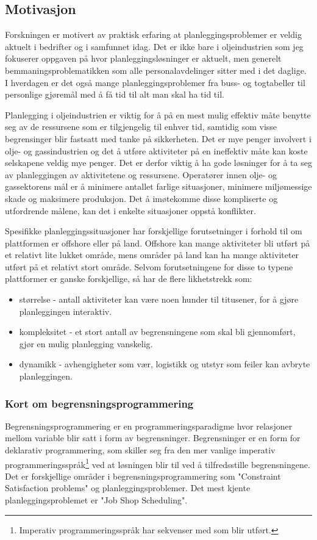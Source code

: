 \subsection{Motivasjon}
Forskningen er motivert av praktisk erfaring at planleggingsproblemer er veldig aktuelt i bedrifter og i samfunnet idag. Det er ikke bare i oljeindustrien som jeg fokuserer oppgaven på hvor planleggingsløsninger er aktuelt, men generelt bemmaningsproblematikken som alle personalavdelinger sitter med i det daglige. I hverdagen er det også mange planleggingsproblemer fra buss- og togtabeller til personlige gjøremål med å få tid til alt man skal ha tid til.

Planlegging i oljeindustrien er viktig for å på en mest mulig effektiv måte benytte seg av de ressursene som er tilgjengelig til enhver tid, samtidig som visse begrensinger blir fastsatt med tanke på sikkerheten. Det er mye penger involvert i olje- og gassindustrien og det å utføre aktiviteter på en ineffektiv måte kan koste selskapene veldig mye penger. Det er derfor viktig å ha gode løsninger for å ta seg av planleggingen av aktivitetene og ressursene. Operatører innen olje- og gassektorens mål er å minimere antallet farlige situasjoner, minimere miljømessige skade og maksimere produksjon. Det å imøtekomme disse kompliserte og utfordrende målene, kan det i enkelte situasjoner oppstå konflikter.

Spesifikke planleggingssituasjoner har forskjellige forutsetninger i forhold til om plattformen er offshore eller på land. Offshore kan mange aktiviteter bli utført på et relativt lite lukket område, mens områder på land kan ha mange aktiviteter utført på et relativt stort område. Selvom forutsetningene for disse to typene plattformer er ganske forskjellige, så har de flere likhetstrekk som:
\begin{itemize}
\item størrelse - antall aktiviteter kan være noen hunder til titusener, for å gjøre planleggingen interaktiv.
\item kompleksitet - et stort antall av begrensningene som skal bli gjennomført, gjør en mulig planlegging vanskelig.
\item dynamikk - avhengigheter som vær, logistikk og utstyr som feiler kan avbryte planleggingen.
\end{itemize}

\subsubsection{Kort om begrensningsprogrammering}
Begrensningsprogrammering er en programmeringsparadigme hvor relasjoner mellom variable blir satt i form av begrensninger. Begrensninger er en form for deklarativ programmering, som skiller seg fra den mer vanlige imperativ programmeringsspråk\footnote{Imperativ programmeringsspråk har sekvenser med som blir utført.} ved at løsningen blir til ved å tilfredsstille begrensningene. Det er forskjellige områder i begrensningsprogrammering som "Constraint Satisfaction problems" og planleggingsproblemer. Det mest kjente planleggingsproblemet er "Job Shop Scheduling".\cite{cpwikipedia}

